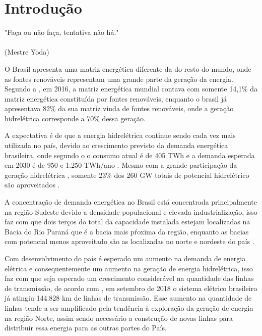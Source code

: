 \chapter{Introdução}
\label{chap:intro}
\begin{flushright}
	"Faça ou não faça, tentativa não há." \\
	\ \\
	(Mestre Yoda)
\end{flushright}

\cite{Autor1998}
O Brasil apresenta uma matriz energética diferente da do resto do mundo, onde as fontes renováveis representam uma grande parte da geração da energia. Segundo a \cite{epe_site}, em 2016, a matriz energética mundial contava com somente 14,1\% da matriz energética constituída por fontes renováveis, enquanto o brasil já apresentava 82\% da sua matriz vinda de fontes renováveis, onde a geração hidrelétrica corresponde a 70\% dessa geração.

A expectativa é de que a energia hidrelétrica continue sendo cada vez mais utilizada no país, devido ao crescimento previsto da demanda energética brasileira, onde segundo o \cite{atlas_aneel} o consumo atual é de 405 TWh e a demanda esperada em 2030 é de 950 e 1.250 TWh/ano \cite{bronzatti_matrizes}. Mesmo com a grande participação da geração hidrelétrica , somente 23\% dos 260 GW totais de potencial hidrelétrico são aproveitados \cite{atlas_aneel}.

A concentração de demanda energética no Brasil está concentrada principalmente na região Sudeste devido a densidade populacional e elevada industrialização, isso faz com que dois terços do total da  capacidade instalada estejam localizadas na Bacia do Rio Paraná  que é a bacia mais pŕoxima da região, enquanto as bacias com potencial menos aproveitado são as localizadas no norte e nordeste do país \cite{atlas_aneel}.

Com desenvolvimento do país é esperado um aumento na demanda de energia elétrica e consequentemente um aumento na geração de energia hidrelétrica, isso faz com que seja esperado um crescimento considerável na quantidade das linhas de transmissão, de acordo com \cite{MME}, em setembro de 2018 o sistema elétrico brasileiro já atingiu 144.828 km de linhas de transmissão.  Esse aumento na quantidade de linhas tende a ser amplificado pela tendência à exploração da geração de energia na região Norte, assim sendo necessário a construção de novas linhas para distribuir essa energia para as outras partes do País.

